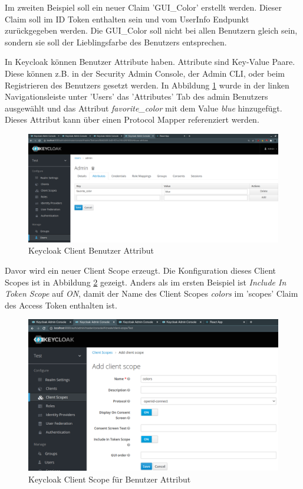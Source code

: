 Im zweiten Beispiel soll ein neuer Claim 'GUI\_Color' erstellt werden. Dieser Claim soll im ID Token enthalten sein und vom UserInfo Endpunkt zurückgegeben werden. Die GUI\_Color soll nicht bei allen Benutzern gleich sein, sondern sie soll der Lieblingsfarbe des Benutzers entsprechen.

In Keycloak können Benutzer Attribute haben. Attribute sind Key-Value Paare. Diese können z.B. in der Security Admin Console, der Admin CLI, oder beim Registrieren des Benutzers gesetzt werden. In Abbildung \ref{fig:EB_Keycloak Client User Attribut} wurde in der linken Navigationsleiste unter 'Users' das 'Attributes' Tab des admin Benutzers ausgewählt und das Attribut \textit{favorite\_color} mit dem Value \textit{blue} hinzugefügt. Dieses Attribut kann über einen Protocol Mapper referenziert werden.

\begin{figure}[!h]
	\centering
	\includegraphics[width=1\textwidth]{Images/Ebert/KeycloakNewUserAttribute.PNG}
	\caption{Keycloak Client Benutzer Attribut}
	\label{fig:EB_Keycloak Client User Attribut}
\end{figure}

Davor wird ein neuer Client Scope erzeugt. Die Konfiguration dieses Client Scopes ist in Abbildung \ref{fig:EB_Keycloak Client Scope für User Attribut} gezeigt. Anders als im ersten Beispiel ist \textit{Include In Token Scope} auf \textit{ON}, damit der Name des Client Scopes \textit{colors} im 'scopes' Claim des Access Token enthalten ist.

\begin{figure}[!h]
	\centering
	\includegraphics[width=1\textwidth]{Images/Ebert/KeycloakNewUserAttributeClientScope.PNG}
	\caption{Keycloak Client Scope für Benutzer Attribut}
	\label{fig:EB_Keycloak Client Scope für User Attribut}
\end{figure}

